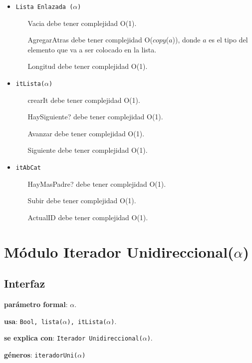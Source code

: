 \documentclass[10pt, a4paper]{article}
\let\TipoVariable=\texttt
\begin{document}
\begin{itemize}
	\item \TipoVariable{Lista Enlazada ($\alpha$)}
	\begin{itemize}
		\item[Vacia] debe tener complejidad O(1).
		\item[AgregarAtras] debe tener complejidad O($copy$($a$)), donde $a$ es el tipo del elemento que va a ser colocado en la lista.
		\item[Longitud] debe tener complejidad O(1).
	\end{itemize}

	\item \TipoVariable{itLista($\alpha$)}
	\begin{itemize}
		\item[crearIt] debe tener complejidad O(1).
		\item[HaySiguiente?] debe tener complejidad O(1).
		\item[Avanzar] debe tener complejidad O(1).
		\item[Siguiente] debe tener complejidad O(1).
	\end{itemize}

	\item \TipoVariable{itAbCat}
	\begin{itemize}
		\item[HayMasPadre?] debe tener complejidad O(1).
		\item[Subir] debe tener complejidad O(1).
		\item[ActualID] debe tener complejidad O(1).
	\end{itemize}
\end{itemize}

\section{M\'odulo Iterador Unidireccional($\alpha$)}

\subsection{Interfaz}

	\textbf{par\'ametro formal}: \TipoVariable{$\alpha$}.

	\textbf{usa}: \TipoVariable{Bool, lista($\alpha$), itLista($\alpha$)}.

	\textbf{se explica con}: \TipoVariable{Iterador Unidireccional($\alpha$)}.

	\textbf{g\'eneros}: \TipoVariable{iteradorUni($\alpha$)}
	
\end{document}
